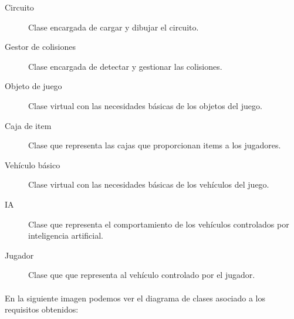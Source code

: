 \begin{description}
    \item [Circuito] Clase encargada de cargar y dibujar el circuito.
    \item [Gestor de colisiones] Clase encargada de detectar y gestionar las colisiones.
    
    \item [Objeto de juego] Clase virtual con las necesidades básicas de los objetos del juego.
    \item [Caja de item] Clase que representa las cajas que proporcionan items a los jugadores.
    \item [Vehículo básico] Clase virtual con las necesidades básicas de los vehículos del juego.
    \item [IA] Clase que representa el comportamiento de los vehículos controlados por inteligencia artificial.
    \item [Jugador] Clase que que representa al vehículo controlado por el jugador.
\end{description}

\paragraph{}
En la siguiente imagen podemos ver el diagrama de clases asociado a los requisitos obtenidos:

\newpage

